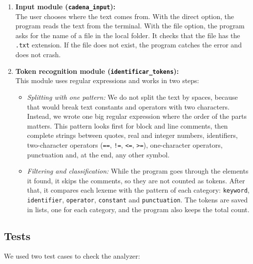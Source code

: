 \documentclass[letterpaper,12pt,oneside]{article}
\begin{document}
\begin{enumerate}
    \item \textbf{Input module (\texttt{cadena\_input}):} \\
    The user chooses where the text comes from. With the direct option, the program reads the text from the terminal. With the file option, the program asks for the name of a file in the local folder. It checks that the file has the \texttt{.txt} extension. If the file does not exist, the program catches the error and does not crash.
    
    \item \textbf{Token recognition module (\texttt{identificar\_tokens}):} \\
    This module uses regular expressions and works in two steps:
    \begin{itemize}
        \item \textit{Splitting with one pattern:} We do not split the text by spaces, because that would break text constants and operators with two characters. Instead, we wrote one big regular expression where the order of the parts matters. This pattern looks first for block and line comments, then complete strings between quotes, real and integer numbers, identifiers, two-character operators (\texttt{==}, \texttt{!=}, \texttt{<=}, \texttt{>=}), one-character operators, punctuation and, at the end, any other symbol.
        \item \textit{Filtering and classification:} While the program goes through the elements it found, it skips the comments, so they are not counted as tokens. After that, it compares each lexeme with the pattern of each category: \texttt{keyword}, \texttt{identifier}, \texttt{operator}, \texttt{constant} and \texttt{punctuation}. The tokens are saved in lists, one for each category, and the program also keeps the total count.
    \end{itemize}
\end{enumerate}

\subsection{Tests}
We used two test cases to check the analyzer:
\end{document}

